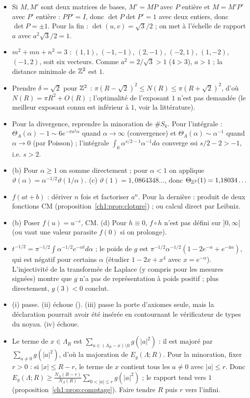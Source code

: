 \begin{itemize}
\item[\ref{ch1:ex:covol}.] Si $M,M'$ sont deux matrices de bases, $M'=MP$ avec $P$ entière et $M=M'P'$ avec $P'$ entière : $PP'=I$, donc $\det P\det P'=1$ avec deux
entiers, donc $\det P=\pm1$. Pour la fin : $\det(u,v)=\sqrt3/2$ ; on met à l'échelle de rapport $a$ avec $a^2\sqrt3/2=1$.
\item[\ref{ch1:ex:voisins}.] $m^2+mn+n^2=3$ : $(1,1)$, $(-1,-1)$, $(2,-1)$, $(-2,1)$, $(1,-2)$, $(-1,2)$, soit six vecteurs. Comme $a^2=2/\sqrt3>1$ ($4>3$), $a>1$ ; la
distance minimale de $\mathbb{Z}^2$ est $1$.\item[\ref{ch1:ex:comptage}.] Prendre $\delta=\sqrt2$ pour $\mathbb{Z}^2$ : $\pi(R-\sqrt2)^2\le N(R)\le\pi(R+\sqrt2)^2$, d'où $N(R)=\pi R^2+O(R)$ ; l'optimalité de l'exposant $1$ n'est pas demandée (le meilleur exposant connu est inférieur à $1$, voir la littérature).
\item[\ref{ch1:ex:epstein}.] Pour la divergence, reprendre la minoration de $\#S_k$. Pour l'intégrale : $\Theta_A(\alpha)-1\sim6e^{-\pi a^2\alpha}$ quand $\alpha\to\infty$ (convergence)
et $\Theta_A(\alpha)\sim\alpha^{-1}$ quand $\alpha\to0$ (par Poisson) ; l'intégrale $\int_0\alpha^{s/2-1}\alpha^{-1}d\alpha$ converge ssi $s/2-2>-1$, i.e. $s>2$.
\item[\ref{ch1:ex:poisson}.] (b) Pour $\alpha\ge1$ on somme directement ; pour $\alpha<1$ on applique $\vartheta(\alpha)=\alpha^{-1/2}\vartheta(1/\alpha)$.
(c) $\vartheta(1)=1{,}0864348\ldots$, donc $\Theta_{\mathbb{Z}^2}(1)=1{,}18034\ldots$
\item[\ref{ch1:ex:clotures}.] $f(at+b)$ : dériver $n$ fois et factoriser $a^n$. Pour la dernière : produit de deux fonctions CM (proposition~\ref{ch1:prop:cloture}) ; ou calcul direct par Leibniz.
\item[\ref{ch1:ex:comp}.] (b) Poser $f(u)=u^{-s}$, CM. (d) Pour $h\equiv 0$, $f\circ h$ n'est pas défini sur $]0,\infty[$ (ou vaut une valeur parasite $f(0)$ si on prolonge).
\item[\ref{ch1:ex:melange}.] $t^{-1/2}=\pi^{-1/2}\int\alpha^{-1/2}e^{-\alpha t}d\alpha$ ; le poids de $g$ est $\pi^{-1/2}\alpha^{-1/2}(1-2e^{-\alpha}+e^{-4\alpha})$, qui est négatif pour
certains $\alpha$ (étudier $1-2x+x^4$ avec $x=e^{-\alpha}$). L'injectivité de la transformée de Laplace (y compris pour les mesures signées) montre que $g$ n'a pas de représentation à poids positif ; plus directement, $g(3)<0$ conclut.
\item[\ref{ch1:ex:lean}.] (i) passe. (ii) échoue (). (iii) passe la porte d'axiomes seule, mais la déclaration pourrait avoir été insérée en contournant le
vérificateur de types du noyau. (iv) échoue.
\item[\ref{ch1:ex:fatou}.] Le terme de $x\in\Lambda_R$ est $\sum_{a\in(\Lambda_R-x)\setminus0}g(|a|^2)$ : il est majoré par $\sum_{a\ne0}g(|a|^2)$, d'où la majoration de $E_g(\Lambda;R)$.
Pour la minoration, fixer $r>0$ : si $|x|\le R-r$, le terme de $x$ contient tous les $a\ne0$ avec $|a|\le r$. Donc
$E_g(\Lambda;R)\ge\frac{N_\Lambda(R-r)}{N_\Lambda(R)}\sum_{0<|a|\le r}g(|a|^2)$ ; le rapport tend vers $1$ (proposition~\ref{ch1:prop:comptage}). Faire tendre $R$ puis $r$ vers l'infini.
\end{itemize}
